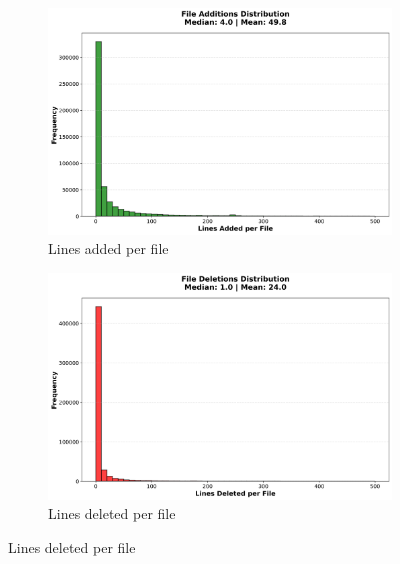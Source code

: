\documentclass[11pt]{article}
\begin{document}
\begin{figure}[H]
\centering
\begin{subfigure}[b]{0.48\textwidth}
\centering
\includegraphics[width=\textwidth]{figures_individual/25_file_additions_histogram.png}
\caption{Lines added per file}
\label{fig:file_adds}
\end{subfigure}
\hfill
\begin{subfigure}[b]{0.48\textwidth}
\centering
\includegraphics[width=\textwidth]{figures_individual/26_file_deletions_histogram.png}
\caption{Lines deleted per file}
\label{fig:file_dels}
\end{subfigure}

\vspace{0.3cm}


\end{figure}
\end{document}
